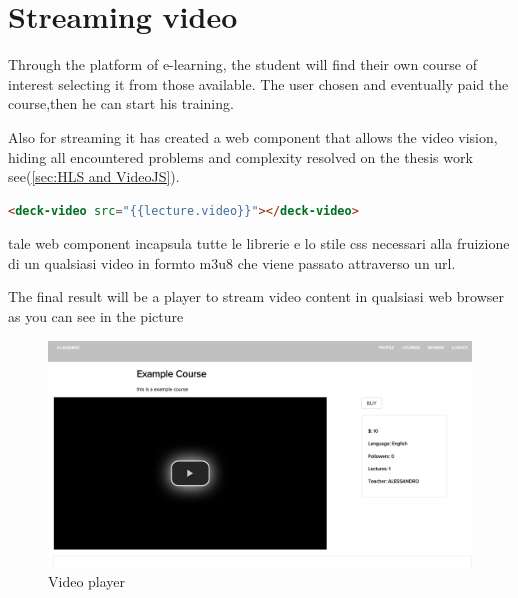 \section{Streaming video}
\label{sec:attend_the_course}

Through the platform of e-learning, the student will find their own course of interest selecting it from those available.
The user chosen and eventually paid the course,then he can start his training.

Also for streaming it has created a web component that allows the video vision, hiding all encountered problems and complexity resolved on the thesis work see(\ref{sec:HLS and VideoJS}).

\begin{lstlisting}[language=html]
  <deck-video src="{{lecture.video}}"></deck-video>
\end{lstlisting}

tale web component incapsula tutte le librerie e lo stile css necessari alla fruizione di un qualsiasi video in formto m3u8 che viene passato attraverso un url.

The final result will be a player to stream video content in qualsiasi web browser as you can see in the picture

\begin{figure}[htb]
 \centering
 \includegraphics[width=1.0\linewidth]{images/chapter6/deck_video.png}\hfill
 \caption[Video player]{Video player}
 \label{fig:fourV}
\end{figure}
